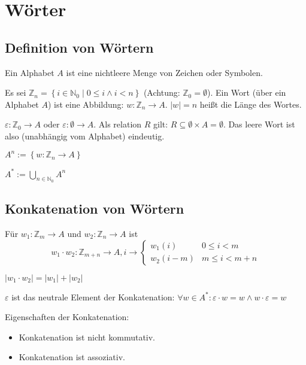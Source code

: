 
\chapter{Wörter}

\section{Definition von Wörtern}
\begin{definition}[Alphabet]
  Ein Alphabet $A$ ist eine nichtleere Menge von Zeichen oder Symbolen.
\end{definition}

\begin{definition}
  Es sei $\mathbb{Z}_n = \left\{ i \in \mathbb{N}_0 \middle| 0 \le i \wedge i < n \right\}$ (Achtung: $\mathbb{Z}_0 = \emptyset$). Ein Wort (über ein Alphabet $A$) ist eine Abbildung: $w: \mathbb{Z}_n \to A$. $|w| = n$ heißt die Länge des Wortes.
\end{definition}
\begin{remark}
  $\varepsilon: \mathbb{Z}_0 \to A$ oder $\varepsilon: \emptyset \to A$. Als relation $R$ gilt: $R \subseteq \emptyset \times A = \emptyset$. Das leere Wort ist also (unabhängig vom Alphabet) eindeutig.
\end{remark}
\begin{definition}
  $A^n := \left\{ w: \mathbb{Z}_n \to A \right\}$
\end{definition}
\begin{definition}
  $A^{*} := \bigcup_{n \in \mathbb{N}_0} A^n$
\end{definition}

\section{Konkatenation von Wörtern}

\begin{definition}[Konkatenation]
  Für $w_1: \mathbb{Z}_m \to A$ und $w_2: \mathbb{Z}_n \to A$ ist
  \[ w_1 \cdot w_2: \mathbb{Z}_{m+n} \to A, i \to
    \begin{cases}
      w_1(i) & 0 \le i < m \\
      w_2(i-m) & m \le i < m+n
    \end{cases}
  \]
\end{definition}
\begin{remark}
  $|w_1 \cdot w_2| = |w_1| + |w_2|$
\end{remark}
\begin{lemma}
  $\varepsilon$ ist das neutrale Element der Konkatenation: $\forall w \in A^{*}: \varepsilon \cdot w = w \wedge w \cdot \varepsilon = w$
\end{lemma}
\begin{remark}
  Eigenschaften der Konkatenation:
  \begin{itemize}
  \item Konkatenation ist nicht kommutativ.
  \item Konkatenation ist assoziativ.
  \end{itemize}
\end{remark}

